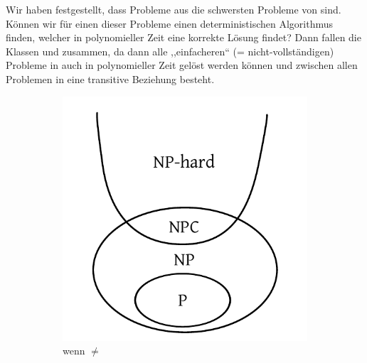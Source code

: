 Wir haben festgestellt, dass Probleme aus \cNPC{} die schwersten Probleme von \cNP{} sind. Können wir für einen dieser Probleme einen deterministischen Algorithmus finden, welcher in polynomieller Zeit eine korrekte Lösung findet? Dann fallen die Klassen \cP{} und \cNP{} zusammen, da dann alle ,,einfacheren`` (= nicht-vollständigen) Probleme in \cNP{} auch in polynomieller Zeit gelöst werden können und zwischen allen Problemen in \cNPC{} eine transitive Beziehung besteht.
%
\begin{figure}
  \begin{center}
    \begin{subfigure}[b]{0.4\textwidth}
      \includegraphics[width=\textwidth]{img/np_neq_p.pdf}
      \caption{wenn \cP{} $\neq$ \cNP{}}
    \end{subfigure}
    \begin{subfigure}[b]{0.4\textwidth}

\end{subfigure}
\end{center}
\end{figure}
